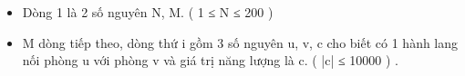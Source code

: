 \begin{itemize}
	\item Dòng 1 là 2 số nguyên N, M. ( 1 ≤ N ≤ 200 )
	\item M dòng tiếp theo, dòng thứ i gồm 3 số nguyên u, v, c cho biết có 1 hành lang nối phòng u với phòng v và giá trị năng lượng là c. ( |c| ≤ 10000 ) .
\end{itemize}

\